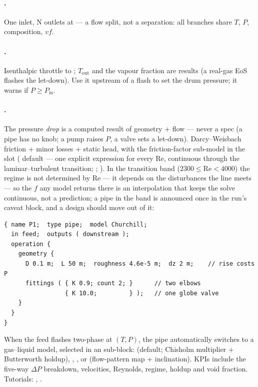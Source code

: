 \documentclass[11pt,a4paper]{article}
\begin{document}
\paragraph{.}  One inlet, N outlets at
 --- a flow split, not a separation: all
branches share $T$, $P$, composition, $vf$.

\paragraph{.}  Isenthalpic throttle to
; $T_{\mathrm{out}}$ and the vapour
fraction are results (a real-gas EoS flashes the let-down).  Use it
upstream of a flash to set the drum pressure; it warns if
$P \ge P_{\mathrm{in}}$.

\paragraph{.}  The pressure \emph{drop} is a computed result
of geometry + flow --- never a spec (a pipe has no knob; a pump raises
$P$, a valve sets a let-down).  Darcy--Weisbach friction + minor losses
+ static head, with the friction-factor sub-model in the 
slot ( default --- one explicit expression for every
$\mathrm{Re}$, continuous through the laminar--turbulent transition;
; ).  In the transition band
($2300 \le \mathrm{Re} < 4000$) the regime is not determined by
$\mathrm{Re}$ --- it depends on the disturbances the line meets --- so the
$f$ any model returns there is an interpolation that keeps the solve
continuous, not a prediction; a pipe in the band is announced once in the
run's caveat block, and a design should move out of it:

\begin{lstlisting}[language=dict]
{ name P1;  type pipe;  model Churchill;
  in feed;  outputs ( downstream );
  operation {
    geometry {
      D 0.1 m;  L 50 m;  roughness 4.6e-5 m;  dz 2 m;    // rise costs P
      fittings ( { K 0.9; count 2; }      // two elbows
                 { K 10.0;         } );   // one globe valve
    }
  }
}
\end{lstlisting}

When the feed flashes two-phase at $(T,P)$, the pipe automatically
switches to a gas--liquid model, selected in an  sub-block: 
(default; Chisholm multiplier + Butterworth holdup),
, , or  (flow-pattern
map + inclination).  KPIs include the five-way $\Delta P$ breakdown,
velocities, Reynolds, regime, holdup and void fraction.  Tutorials:
, .
\end{document}
